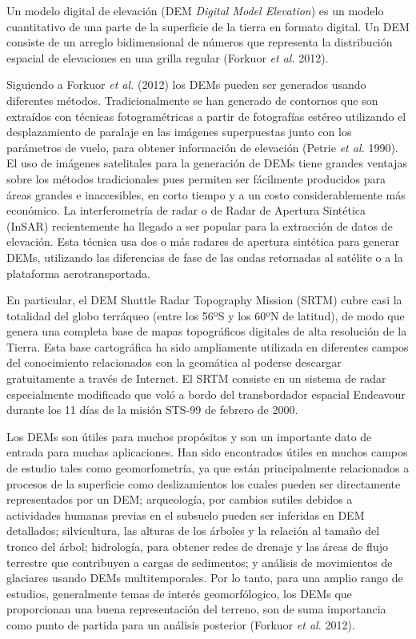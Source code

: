 \documentclass[10pt,a4paper, twoside]{report}
\begin{document}
Un modelo digital de elevación (DEM \textit{Digital Model Elevation}) es un modelo cuantitativo de una parte de la superficie de la tierra en formato digital. Un DEM consiste de un arreglo bidimensional  de números que representa la distribución espacial de elevaciones en una grilla regular (Forkuor \textit{et al.} 2012).

Siguiendo a Forkuor \textit{et al.} (2012) los DEMs pueden ser generados usando diferentes métodos. Tradicionalmente se han generado de contornos que son extraídos con técnicas fotogramétricas a partir de fotografías estéreo utilizando el desplazamiento de paralaje en las imágenes superpuestas junto con los parámetros de vuelo, para obtener información de elevación (Petrie \textit{et al.} 1990). El uso de imágenes satelitales para la generación de DEMs tiene grandes ventajas sobre los métodos tradicionales pues permiten ser fácilmente producidos para áreas grandes e inaccesibles, en corto tiempo y a un costo considerablemente más económico. La interferometría de radar o de Radar de Apertura Sintética (InSAR) recientemente ha llegado a ser popular para la extracción de datos de elevación. Esta técnica usa dos o más radares de apertura sintética para generar DEMs, utilizando las diferencias de fase de las ondas retornadas al satélite o a la plataforma aerotransportada.

En particular, el DEM Shuttle Radar Topography Mission (SRTM) cubre casi la totalidad del globo terráqueo (entre los 56ºS y los 60ºN de latitud), de modo que genera una completa base de mapas topográficos digitales de alta resolución de la Tierra. Esta base cartográfica ha sido ampliamente utilizada en diferentes campos del conocimiento relacionados con la geomática al poderse descargar gratuitamente a través de Internet. El SRTM consiste en un sistema de radar especialmente modificado que voló a bordo del transbordador espacial Endeavour durante los 11 días de la misión STS-99 de febrero de 2000.

Los DEMs son útiles para muchos propósitos y son un importante dato de entrada para muchas aplicaciones. Han sido encontrados útiles en muchos campos de estudio tales como geomorfometría, ya que están principalmente relacionados a procesos de la superficie como deslizamientos los cuales pueden ser directamente representados por un DEM; arqueología, por cambios sutiles debidos a actividades humanas previas en el subsuelo pueden ser inferidas en DEM detallados; silvicultura, las alturas de los árboles y la relación al tamaño del tronco del árbol; hidrología, para obtener redes de drenaje y las áreas de flujo terrestre que contribuyen a cargas de sedimentos; y análisis de movimientos de glaciares usando DEMs multitemporales. Por lo tanto, para una amplio rango de estudios, generalmente temas de interés geomorfólogico, los DEMs que proporcionan una buena representación del terreno, son de suma importancia como punto de partida para un análisis posterior (Forkuor \textit{et al.} 2012).
\end{document}
